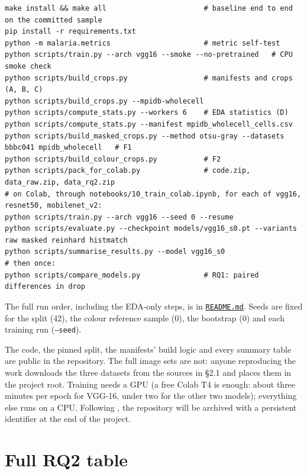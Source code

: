 \documentclass[11pt,a4paper]{article}
\begin{document}
\begin{Verbatim}[fontsize=\fontsize{6.5}{8}\selectfont,frame=none]
make install && make all                       # baseline end to end on the committed sample
pip install -r requirements.txt
python -m malaria.metrics                      # metric self-test
python scripts/train.py --arch vgg16 --smoke --no-pretrained   # CPU smoke check
python scripts/build_crops.py                  # manifests and crops (A, B, C)
python scripts/build_crops.py --mpidb-wholecell
python scripts/compute_stats.py --workers 6    # EDA statistics (D)
python scripts/compute_stats.py --manifest mpidb_wholecell_cells.csv
python scripts/build_masked_crops.py --method otsu-gray --datasets bbbc041 mpidb_wholecell   # F1
python scripts/build_colour_crops.py           # F2
python scripts/pack_for_colab.py               # code.zip, data_raw.zip, data_rq2.zip
# on Colab, through notebooks/10_train_colab.ipynb, for each of vgg16, resnet50, mobilenet_v2:
python scripts/train.py --arch vgg16 --seed 0 --resume
python scripts/evaluate.py --checkpoint models/vgg16_s0.pt --variants raw masked reinhard histmatch
python scripts/summarise_results.py --model vgg16_s0
# then once:
python scripts/compare_models.py               # RQ1: paired differences in drop
\end{Verbatim}

The full run order, including the EDA-only steps, is in \href{https://gitlab.uvt.nl/capstone/2026-fall/u927271/-/blob/v1.0-final/README.md}{\texttt{README.\allowbreak{}md}}. Seeds are fixed for the split (42), the colour reference sample (0), the bootstrap (0) and each training run (\texttt{--seed}).

The code, the pinned split, the manifests' build logic and every summary table are public in the repository. The full image sets are not: anyone reproducing the work downloads the three datasets from the sources in \S{}2.1 and places them in the project root. Training needs a GPU (a free Colab T4 is enough: about three minutes per epoch for VGG-16, under two for the other two models); everything else runs on a CPU. Following \citet{dicosmo2026}, the repository will be archived with a persistent identifier at the end of the project.

\nocite{aiact2024,mdr2017}
\printbibliography[heading=ctbib,title=References]

\appendix
\setcounter{table}{0}

\clearpage
\section{Full RQ2 table}
\end{document}
